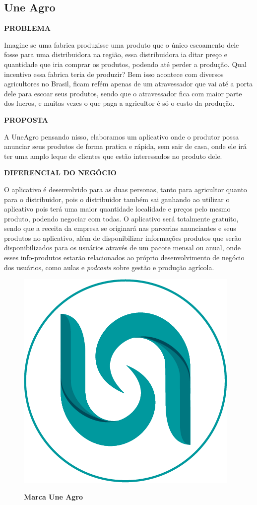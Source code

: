 \subsection{Une Agro}

\textbf{PROBLEMA}

Imagine se uma fabrica produzisse uma produto que o único escoamento dele fosse para uma distribuidora na região, essa distribuidora ia ditar preço e quantidade que iria comprar os produtos, podendo até perder a produção. Qual incentivo essa fabrica teria de produzir? Bem isso acontece com diversos agricultores no Brasil, ficam refém apenas de um atravessador que vai até a porta dele para escoar seus produtos, sendo que o atravessador fica com maior parte dos lucros, e muitas vezes o que paga a agricultor é só o custo da produção.

\textbf{PROPOSTA}

A UneAgro pensando nisso, elaboramos um aplicativo onde o produtor possa anunciar seus produtos de forma pratica e rápida, sem sair de casa, onde ele irá ter uma amplo leque de clientes que estão interessados no produto dele.

\textbf{DIFERENCIAL DO NEGÓCIO}

O aplicativo é desenvolvido para as duas personas, tanto para agricultor quanto para o distribuidor, pois o distribuidor também sai ganhando ao utilizar o aplicativo pois terá uma maior quantidade localidade e preços pelo mesmo produto, podendo negociar com todas. O aplicativo será totalmente gratuito, sendo que a receita da empresa se originará nas parcerias anunciantes e seus produtos no aplicativo, além de disponibilizar informações produtos que serão disponibilizados para os usuários através de um pacote mensal ou anual, onde esses info-produtos estarão relacionados ao próprio desenvolvimento de negócio dos usuários, como aulas e \textit{podcasts} sobre gestão e produção agrícola.

\begin{figure}[!htb]
\centering
\caption{\textbf{Marca Une Agro}}
\includegraphics[scale=1.5]{Imagens/uneagro.png}
\label{figura_28}
\end{figure}
\newpage

